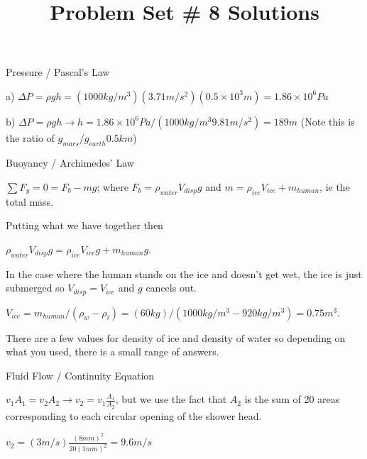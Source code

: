 \documentclass[10pt]{article}
\newenvironment{problem}[2][Problem]{\begin{trivlist}
\item[\hskip \labelsep {\bfseries #1}\hskip \labelsep {\bfseries #2.}]}{\end{trivlist}}
\begin{document}
 \title{Problem Set \# 8 Solutions}
 \author{}
\date{}
\maketitle

\begin{problem}{1} Pressure / Pascal's Law\\
\item a) $\Delta P = \rho g h = (1000kg/m^3)(3.71m/s^2)(0.5\times 10^3m)=1.86 \times 10^6 Pa$
\item b) $\Delta P = \rho g h \xrightarrow[]{} h = 1.86\times 10^6Pa/(1000kg/m^3 9.81 m/s^2)=189m$ (Note this is the ratio of $g_{mars}/g_{earth} 0.5km$)
\end{problem}

\begin{problem}{2} Buoyancy / Archimedes' Law\\
\item 
$\sum F_y = 0=F_b - mg$; where $F_b = \rho_{water}V_{disp}g$ and $m=\rho_{ice}V_{ice}+m_{human}$, ie the total mass.
\item Putting what we have together then
\item $\rho_{water}V_{disp}g = \rho_{ice}V_{ice}g+m_{human}g$.
\item In the case where the human stands on the ice and doesn't get wet, the ice is just submerged so $V_{disp} = V_{ice}$ and $g$ cancels out.
\item $V_{ice} = m_{human}/(\rho_w - \rho_i) = (60kg)/(1000kg/m^3 - 920kg/m^3)=0.75m^3$.
\item There are a few values for density of ice and density of water so depending on what you used, there is a small range of answers.
\end{problem}

\begin{problem}{3} Fluid Flow / Continuity Equation\\

\item $v_1A_1 = v_2A_2 \xrightarrow[]{} v_2 = v_1 \frac{A_1}{A_2}$, but we use the fact that $A_2$ is the sum of 20 areas corresponding to each circular opening of the shower head.

\item $v_2 = (3m/s)\frac{(8mm)^2}{20(1mm)^2}=9.6m/s$

\end{problem}
\end{document}
